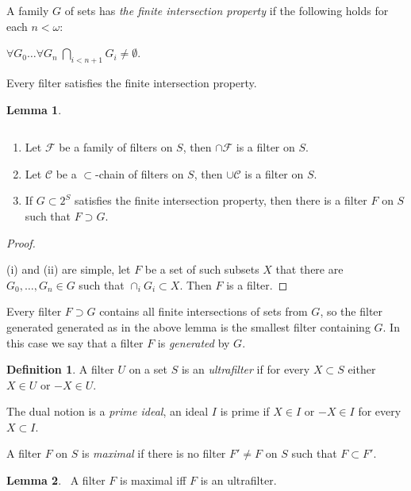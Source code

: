 \documentclass[8pt]{article}
\theoremstyle{definition}
\newtheorem{definition}{Definition}[section]
\theoremstyle{definition}
\theoremstyle{definition}
\theoremstyle{definition}
\theoremstyle{definition}
\theoremstyle{definition}
\theoremstyle{definition}
\theoremstyle{definition}
\newtheorem{lemma}{Lemma}[section]
\theoremstyle{definition}
\theoremstyle{definition}
\theoremstyle{definition}
\theoremstyle{definition}
\theoremstyle{definition}
\theoremstyle{definition}
\theoremstyle{question}
\begin{document}
A family $G$ of sets has \emph{the finite intersection property} if the following holds for each $n < \omega$:
\begin{center}
  $\forall G_0 \dots \forall G_n \: \bigcap \limits_{i < n + 1} G_i \neq \emptyset$.
\end{center}
Every filter satisfies the finite intersection property.

\begin{lemma}~\label{filter:exists}

$ $

  \begin{enumerate}
    \item Let $\mathcal{F}$ be a family of filters on $S$, then $\cap \mathcal{F}$ is a filter on $S$.
    \item Let $\mathcal{C}$ be a $\subset$-chain of filters on $S$, then $\cup \mathcal{C}$ is a filter on $S$.
    \item If $G \subset 2^S$ satisfies the finite intersection property, then there is a filter $F$ on $S$ such that
    $F \supset G$.
  \end{enumerate}
\end{lemma}

\begin{proof}
  $ $

  (i) and (ii) are simple, let $F$ be a set of such subsets $X$ that there are $G_0, \dots, G_n \in G$ such that 
  $\cap_i G_i \subset X$. Then $F$ is a filter.
\end{proof}

Every filter $F \supset G$ contains all finite intersections of sets from $G$, so the filter generated
generated as in the above lemma is the smallest filter containing $G$. In this case we say that a filter 
$F$ is \emph{generated} by $G$.

\begin{definition}
  A filter $U$ on a set $S$ is an \emph{ultrafilter} if
  for every $X \subset S$ either $X \in U$ or $- X \in U$.
\end{definition}
The dual notion is a \emph{prime ideal}, an ideal $I$ is prime if $X \in I$ or $- X \in I$
for every $X \subset I$.

A filter $F$ on $S$ is \emph{maximal} if there is no filter $F' \neq F$ on $S$ such that $F \subset F'$.

\begin{lemma}~\label{ultra:max}
  A filter $F$ is maximal iff $F$ is an ultrafilter.
\end{lemma}
\end{document}
